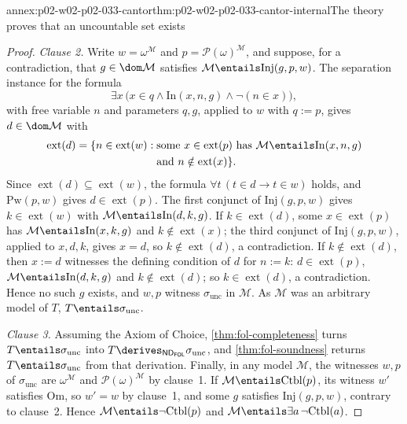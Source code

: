 \begin{annexitem}{annex:p02-w02-p02-033-cantor}{thm:p02-w02-p02-033-cantor-internal}{The theory proves that an uncountable set exists}
\begin{proof}
\emph{Clause 2.}  Write \(w=\omega^{\mathcal M}\) and
\(p=\mathcal P(\omega)^{\mathcal M}\), and suppose, for a contradiction,
that \(g\in\dom\mathcal M\) satisfies
\(\mathcal M\entails\mathrm{Inj}(g,p,w)\).  The separation instance for the
formula
\[
 \exists x\,\bigl(x\in q\land\mathrm{In}(x,n,g)\land\neg(n\in x)\bigr),
\]
with free variable \(n\) and parameters \(q,g\), applied to \(w\) with
\(q:=p\), gives \(d\in\dom\mathcal M\) with
\[
\begin{aligned}
 \operatorname{ext}(d)=\{n\in\operatorname{ext}(w):{}&\text{some }
 x\in\operatorname{ext}(p)\text{ has }\mathcal M\entails\mathrm{In}(x,n,g)\\
 &\text{and }n\notin\operatorname{ext}(x)\}.
\end{aligned}
\]
Since \(\operatorname{ext}(d)\subseteq\operatorname{ext}(w)\), the formula
\(\forall t\,(t\in d\to t\in w)\) holds, and \(\mathrm{Pw}(p,w)\) gives
\(d\in\operatorname{ext}(p)\).  The first conjunct of
\(\mathrm{Inj}(g,p,w)\) gives \(k\in\operatorname{ext}(w)\) with
\(\mathcal M\entails\mathrm{In}(d,k,g)\).
If \(k\in\operatorname{ext}(d)\), some \(x\in\operatorname{ext}(p)\) has
\(\mathcal M\entails\mathrm{In}(x,k,g)\) and
\(k\notin\operatorname{ext}(x)\); the third conjunct of
\(\mathrm{Inj}(g,p,w)\), applied to \(x,d,k\), gives \(x=d\), so
\(k\notin\operatorname{ext}(d)\), a contradiction.
If \(k\notin\operatorname{ext}(d)\), then \(x:=d\) witnesses the defining
condition of \(d\) for \(n:=k\): \(d\in\operatorname{ext}(p)\),
\(\mathcal M\entails\mathrm{In}(d,k,g)\) and \(k\notin\operatorname{ext}(d)\);
so \(k\in\operatorname{ext}(d)\), a contradiction.  Hence no such \(g\)
exists, and \(w,p\) witness \(\sigma_{\mathrm{unc}}\) in \(\mathcal M\).
As \(\mathcal M\) was an arbitrary model of \(T\),
\(T\entails\sigma_{\mathrm{unc}}\).

\emph{Clause 3.}  Assuming the Axiom of Choice,
\cref{thm:fol-completeness} turns \(T\entails\sigma_{\mathrm{unc}}\) into
\(T\derives_{\mathsf{ND}_{\mathsf{FOL}}}\sigma_{\mathrm{unc}}\), and
\cref{thm:fol-soundness} returns \(T\entails\sigma_{\mathrm{unc}}\) from that
derivation.  Finally, in any model \(\mathcal M\), the witnesses \(w,p\) of
\(\sigma_{\mathrm{unc}}\) are \(\omega^{\mathcal M}\) and
\(\mathcal P(\omega)^{\mathcal M}\) by clause~1.  If
\(\mathcal M\entails\mathrm{Ctbl}(p)\), its witness \(w'\) satisfies
\(\mathrm{Om}\), so \(w'=w\) by clause~1, and some \(g\) satisfies
\(\mathrm{Inj}(g,p,w)\), contrary to clause~2.  Hence
\(\mathcal M\entails\neg\mathrm{Ctbl}(p)\) and
\(\mathcal M\entails\exists a\,\neg\mathrm{Ctbl}(a)\).
\end{proof}
\end{annexitem}

